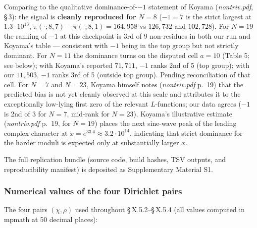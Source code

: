 Comparing to the qualitative dominance-of-\(-1\) statement of Koyama
(\emph{nontriv.pdf}, \S\,3): the signal is \textbf{cleanly reproduced for
\(N = 8\)} (\(-1 = 7\) is the strict largest at \(1.3 \cdot 10^{13}\),
\(\pi(\cdot ; 8, 7) - \pi(\cdot ; 8, 1) = 164{,}958\) vs \(126{,}732\)
and \(102{,}728\)). For \(N = 19\) the ranking of \(-1\) at this checkpoint
is 3rd of 9 non-residues in both our run and Koyama's table ---
consistent with \(-1\) being in the top group but not strictly
dominant. For \(N = 11\) the dominance turns on the disputed cell
\(a = 10\) (Table 5; see below); with Koyama's reported \(71{,}711\),
\(-1\) ranks 2nd of 5 (top group); with our \(11{,}503\), \(-1\) ranks
3rd of 5 (outside top group). Pending reconciliation of that cell.
For \(N = 7\) and \(N = 23\), Koyama himself notes (\emph{nontriv.pdf} p.~19)
that the predicted bias is not yet cleanly observed at this scale
and attributes it to the exceptionally low-lying first zero of the
relevant \(L\)-functions; our data agrees (\(-1\) is 2nd of 3 for
\(N = 7\), mid-rank for \(N = 23\)). Koyama's illustrative estimate
(\emph{nontriv.pdf} p.~19, for \(N = 19\)) places the next sine-wave
peak of the leading complex character at
\(x = e^{33.4} \approx 3.2 \cdot 10^{14}\), indicating that
strict dominance for the harder moduli is expected only at
substantially larger \(x\).

The full replication bundle (source code, build hashes, TSV
outputs, and reproducibility manifest) is deposited as
Supplementary Material S1.

\subsubsection{Numerical values of the four Dirichlet pairs}

The four pairs \((\chi, \rho)\) used throughout \S\,X.5.2--\S\,X.5.4 (all
values computed in mpmath at 50 decimal places):

